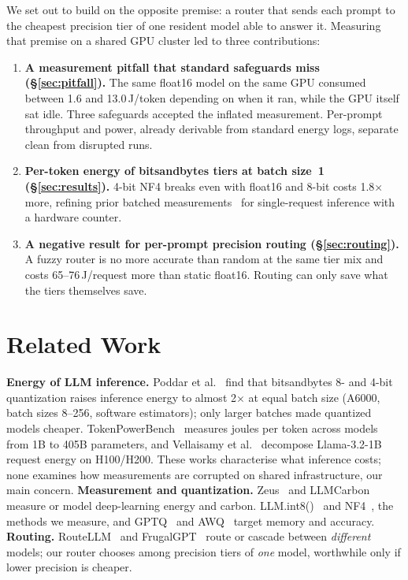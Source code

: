 \documentclass[conference]{IEEEtran}
\begin{document}
We set out to build on the opposite premise: a router that sends each prompt to the cheapest precision tier of one resident model able to answer it. Measuring that premise on a shared GPU cluster led to three contributions:
\begin{enumerate}
\item \textbf{A measurement pitfall that standard safeguards miss (§\ref{sec:pitfall}).} The same float16 model on the same GPU consumed between 1.6 and 13.0\,J/token depending on when it ran, while the GPU itself sat idle. Three safeguards accepted the inflated measurement. Per-prompt throughput and power, already derivable from standard energy logs, separate clean from disrupted runs.
\item \textbf{Per-token energy of bitsandbytes tiers at batch size~1 (§\ref{sec:results}).} 4-bit NF4 breaks even with float16 and 8-bit costs 1.8$\times$ more, refining prior batched measurements~\cite{poddar2025} for single-request inference with a hardware counter.
\item \textbf{A negative result for per-prompt precision routing (§\ref{sec:routing}).} A fuzzy router is no more accurate than random at the same tier mix and costs 65--76\,J/request more than static float16. Routing can only save what the tiers themselves save.
\end{enumerate}

\section{Related Work}
\textbf{Energy of LLM inference.} Poddar et al.~\cite{poddar2025} find that bitsandbytes 8- and 4-bit quantization raises inference energy to almost 2$\times$ at equal batch size (A6000, batch sizes 8--256, software estimators); only larger batches made quantized models cheaper. TokenPowerBench~\cite{niu2026tokenpower} measures joules per token across models from 1B to 405B parameters, and Vellaisamy et al.~\cite{vellaisamy2026} decompose Llama-3.2-1B request energy on H100/H200. These works characterise what inference costs; none examines how measurements are corrupted on shared infrastructure, our main concern.
\textbf{Measurement and quantization.} Zeus~\cite{you2023zeus} and LLMCarbon~\cite{faiz2024llmcarbon} measure or model deep-learning energy and carbon. LLM.int8()~\cite{dettmers2022int8} and NF4~\cite{dettmers2023qlora}, the methods we measure, and GPTQ~\cite{frantar2023gptq} and AWQ~\cite{lin2024awq} target memory and accuracy.
\textbf{Routing.} RouteLLM~\cite{ong2024routellm} and FrugalGPT~\cite{chen2023frugalgpt} route or cascade between \emph{different} models; our router chooses among precision tiers of \emph{one} model, worthwhile only if lower precision is cheaper.
\end{document}
